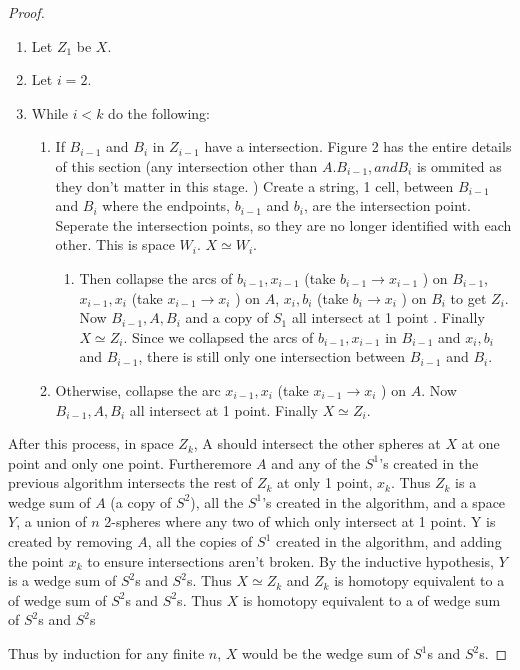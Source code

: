 \documentclass{article}
\begin{document}
\begin{proof}
    \begin{enumerate}
        \item Let $Z_1$ be $X$.
        \item Let $i = 2$. 
        \item While $i < k$ do the following:
        \begin{enumerate}
            \item If $B_{i - 1}$ and $B_i$ in $Z_{i - 1}$ have a intersection. Figure 2 has the entire details of this section (any intersection other than $A. B_{i - 1}, and B_i$ is ommited as they don't matter in this stage. ) Create a string, 1 cell, between $B_{i - 1}$ and $B_i$ where the endpoints, $b_{i - 1}$ and $b_i$, are the intersection point. Seperate the intersection points, so they are no longer identified with each other. This is space $W_i$. $X \simeq W_i$.
            \begin{enumerate}
                \item Then collapse the arcs of $b_{i - 1}, x_{i - 1}$ (take $b_{i - 1} \to x_{i - 1}$ ) on $B_{i - 1}$, $x_{i - 1}, x_{i}$ (take $x_{i - 1} \to x_{i}$ ) on $A$, $x_{i}, b_i$ (take $b_{i} \to x_{i}$ ) on $B_i$ to get $Z_i$. Now $B_{i - 1}, A, B_i$ and a copy of $S_1$ all intersect at 1 point . Finally $X \simeq Z_i$. Since we collapsed the arcs of $b_{i - 1}, x_{i - 1}$ in $B_{i - 1}$ and $x_{i}, b_i$ and $B_{i - 1}$, there is still only one intersection between $B_{i - 1}$ and $B_i$.
            \end{enumerate}
            \item Otherwise, collapse the arc $x_{i - 1}, x_{i}$ (take $x_{i - 1} \to x_{i}$ ) on $A$. Now $B_{i - 1}, A, B_i$ all intersect at 1 point. Finally $X \simeq Z_i$.                           
        \end{enumerate}
    \end{enumerate}

    After this process, in space $Z_k$, A should intersect the other spheres at $X$ at one point and only one point. Furtheremore $A$ and any of the $S^1$'s created in the previous algorithm intersects the rest of $Z_k$ at only 1 point, $x_k$. Thus $Z_k$ is a wedge sum of $A$ (a copy of $S^2$), all the $S^1$'s created in the algorithm, and a space $Y$, a union of $n$ 2-spheres where any two of which only intersect at 1 point. Y is created by removing $A$, all the copies of $S^1$ created in the algorithm, and adding the point $x_k$ to ensure intersections aren't broken. By the inductive hypothesis, $Y$ is a wedge sum of $S^2$s and $S^2$s. Thus $X \simeq Z_k$ and $Z_k$ is homotopy equivalent to a of wedge sum of $S^2$s and $S^2$s. Thus $X$ is homotopy equivalent to a of wedge sum of $S^2$s and $S^2$s  
    

    Thus by induction for any finite $n$, $X$ would be the wedge sum of $S^1$s and $S^2$s.     
\end{proof}
\end{document}
